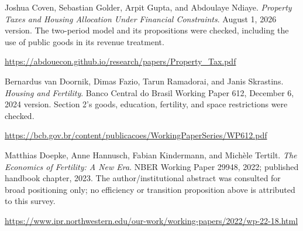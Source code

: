\documentclass[11pt]{article}
\begin{document}
Joshua Coven, Sebastian Golder, Arpit Gupta, and Abdoulaye Ndiaye. \emph{Property Taxes and Housing Allocation Under Financial Constraints}. August 1, 2026 version. The two-period model and its propositions were checked, including the use of public goods in its revenue treatment.\par
\url{https://abdouecon.github.io/research/papers/Property_Tax.pdf}

Bernardus van Doornik, Dimas Fazio, Tarun Ramadorai, and Janis Skrastins. \emph{Housing and Fertility}. Banco Central do Brasil Working Paper 612, December 6, 2024 version. Section 2's goods, education, fertility, and space restrictions were checked.\par
\url{https://bcb.gov.br/content/publicacoes/WorkingPaperSeries/WP612.pdf}

Matthias Doepke, Anne Hannusch, Fabian Kindermann, and Mich\`ele Tertilt. \emph{The Economics of Fertility: A New Era}. NBER Working Paper 29948, 2022; published handbook chapter, 2023. The author/institutional abstract was consulted for broad positioning only; no efficiency or transition proposition above is attributed to this survey.\par
\url{https://www.ipr.northwestern.edu/our-work/working-papers/2022/wp-22-18.html}
\end{document}
